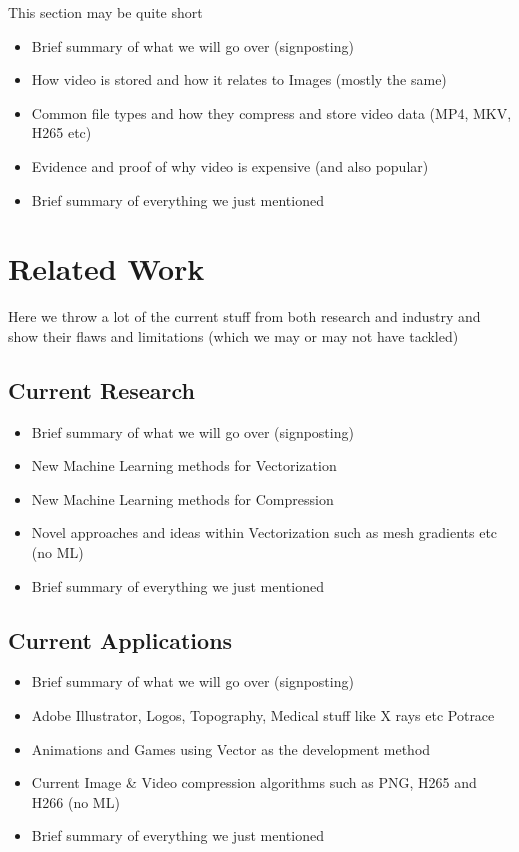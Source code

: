\documentclass[12pt]{article}
\begin{document}
    This section may be quite short

    \begin{itemize}
        \item Brief summary of what we will go over (signposting)
        \item How video is stored and how it relates to Images (mostly the same)
        \item Common file types and how they compress and store video data (MP4, MKV, H265 etc)
        \item Evidence and proof of why video is expensive (and also popular)
        \item Brief summary of everything we just mentioned
    \end{itemize}

    \pagebreak


    \section{Related Work}\label{sec:related-work}

    Here we throw a lot of the current stuff from both research and industry and show their flaws and limitations
    (which we may or may not have tackled)

    \subsection{Current Research}\label{subsec:current-research}

    \begin{itemize}
        \item Brief summary of what we will go over (signposting)
        \item New Machine Learning methods for Vectorization
        \item New Machine Learning methods for Compression
        \item Novel approaches and ideas within Vectorization such as mesh gradients etc (no ML)
        \item Brief summary of everything we just mentioned
    \end{itemize}

    \subsection{Current Applications}\label{subsec:current-applications}

    \begin{itemize}
        \item Brief summary of what we will go over (signposting)
        \item Adobe Illustrator, Logos, Topography, Medical stuff like X rays etc Potrace
        \item Animations and Games using Vector as the development method
        \item Current Image \& Video compression algorithms such as PNG, H265 and H266 (no ML)
        \item Brief summary of everything we just mentioned
    \end{itemize}
\end{document}
